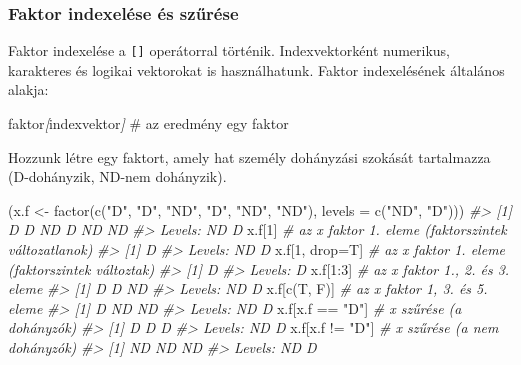 \documentclass[
]{book}
\newenvironment{Shaded}{\begin{snugshade}}{\end{snugshade}}
\newcommand{\AttributeTok}[1]{\textcolor[rgb]{0.77,0.63,0.00}{#1}}
\newcommand{\CommentTok}[1]{\textcolor[rgb]{0.56,0.35,0.01}{\textit{#1}}}
\newcommand{\DecValTok}[1]{\textcolor[rgb]{0.00,0.00,0.81}{#1}}
\newcommand{\FunctionTok}[1]{\textcolor[rgb]{0.00,0.00,0.00}{#1}}
\newcommand{\NormalTok}[1]{#1}
\newcommand{\OtherTok}[1]{\textcolor[rgb]{0.56,0.35,0.01}{#1}}
\newcommand{\SpecialCharTok}[1]{\textcolor[rgb]{0.00,0.00,0.00}{#1}}
\newcommand{\StringTok}[1]{\textcolor[rgb]{0.31,0.60,0.02}{#1}}
\begin{document}
\hypertarget{faktor-indexeluxe9se-uxe9s-szux171ruxe9se}{%
\subsubsection{Faktor indexelése és szűrése}\label{faktor-indexeluxe9se-uxe9s-szux171ruxe9se}}

Faktor indexelése a \texttt{{[}{]}} operátorral történik. Indexvektorként numerikus, karakteres és logikai vektorokat is használhatunk. Faktor indexelésének általános alakja:

\begin{Shaded}
\begin{Highlighting}[]
\NormalTok{faktor}\CommentTok{[}\OtherTok{indexvektor}\CommentTok{]}\NormalTok{     \# az eredmény egy faktor}
\end{Highlighting}
\end{Shaded}

Hozzunk létre egy faktort, amely hat személy dohányzási szokását tartalmazza (D-dohányzik, ND-nem dohányzik).

\begin{Shaded}
\begin{Highlighting}[]
\NormalTok{(x.f }\OtherTok{\textless{}{-}} \FunctionTok{factor}\NormalTok{(}\FunctionTok{c}\NormalTok{(}\StringTok{"D"}\NormalTok{, }\StringTok{"D"}\NormalTok{, }\StringTok{"ND"}\NormalTok{, }\StringTok{"D"}\NormalTok{, }\StringTok{"ND"}\NormalTok{, }\StringTok{"ND"}\NormalTok{), }\AttributeTok{levels =} \FunctionTok{c}\NormalTok{(}\StringTok{"ND"}\NormalTok{, }\StringTok{"D"}\NormalTok{)))}
\CommentTok{\#\textgreater{} [1] D  D  ND D  ND ND}
\CommentTok{\#\textgreater{} Levels: ND D}
\NormalTok{x.f[}\DecValTok{1}\NormalTok{]             }\CommentTok{\# az x faktor 1. eleme (faktorszintek változatlanok)}
\CommentTok{\#\textgreater{} [1] D}
\CommentTok{\#\textgreater{} Levels: ND D}
\NormalTok{x.f[}\DecValTok{1}\NormalTok{, drop}\OtherTok{=}\NormalTok{T]     }\CommentTok{\# az x faktor 1. eleme (faktorszintek változtak)}
\CommentTok{\#\textgreater{} [1] D}
\CommentTok{\#\textgreater{} Levels: D}
\NormalTok{x.f[}\DecValTok{1}\SpecialCharTok{:}\DecValTok{3}\NormalTok{]           }\CommentTok{\# az x faktor 1., 2. és 3. eleme}
\CommentTok{\#\textgreater{} [1] D  D  ND}
\CommentTok{\#\textgreater{} Levels: ND D}
\NormalTok{x.f[}\FunctionTok{c}\NormalTok{(T, F)]       }\CommentTok{\# az x faktor 1, 3. és 5. eleme}
\CommentTok{\#\textgreater{} [1] D  ND ND}
\CommentTok{\#\textgreater{} Levels: ND D}
\NormalTok{x.f[x.f }\SpecialCharTok{==} \StringTok{"D"}\NormalTok{]    }\CommentTok{\# x szűrése (a dohányzók)}
\CommentTok{\#\textgreater{} [1] D D D}
\CommentTok{\#\textgreater{} Levels: ND D}
\NormalTok{x.f[x.f }\SpecialCharTok{!=} \StringTok{"D"}\NormalTok{]    }\CommentTok{\# x szűrése (a nem dohányzók)}
\CommentTok{\#\textgreater{} [1] ND ND ND}
\CommentTok{\#\textgreater{} Levels: ND D}
\end{Highlighting}
\end{Shaded}
\end{document}
